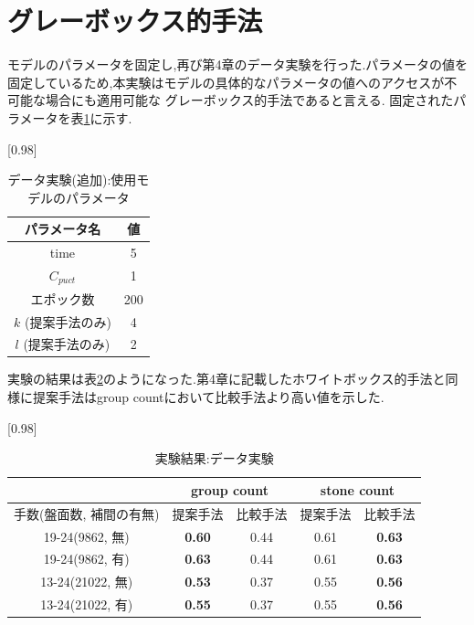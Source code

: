 \section{グレーボックス的手法}
\label{sec:gray}
モデルのパラメータを固定し,再び第4章のデータ実験を行った.パラメータの値を固定しているため,本実験はモデルの具体的なパラメータの値へのアクセスが不可能な場合にも適用可能な
グレーボックス的手法であると言える.
固定されたパラメータを表\ref{table:param-data-extra}に示す.
\begin{table}[H]
	\caption{データ実験(追加):使用モデルのパラメータ}
	\centering
	\scalebox{0.98}[0.98]{
		\begin{tabular}{c|c}
			パラメータ名 & 値 \\ \hline
			time    & 5 \\ 
			$C_{puct}$    & 1 \\
			エポック数 & 200 \\
			$k$ (提案手法のみ)     & 4 \\
			$l$ (提案手法のみ)     & 2 \\
		\end{tabular}
	}
	\label{table:param-data-extra}
\end{table}

実験の結果は表\ref{table:result-offline}のようになった.第4章に記載したホワイトボックス的手法と同様に提案手法はgroup countにおいて比較手法より高い値を示した.
\begin{table}[H]
	\caption{実験結果:データ実験}
	\centering
	\scalebox{0.98}[0.98]{
		\begin{tabular}{c|c|c|c|c}
			\multicolumn{1}{c}{} & \multicolumn{2}{|c|}{group count} 
			& \multicolumn{2}{c|}{stone count}\\ \hline \hline
			手数(盤面数, 補間の有無)    & 提案手法 & 比較手法 & 提案手法 & 比較手法 \\ \hline
			19-24(9862, 無)    & \bf{0.60} & 0.44 & 0.61 & \bf{0.63} \\
			19-24(9862, 有)    & \bf{0.63} & 0.44 & 0.61 & \bf{0.63}  \\
			13-24(21022, 無)   & \bf{0.53} & 0.37 & 0.55 & \bf{0.56}  \\
			13-24(21022, 有)   & \bf{0.55} & 0.37 & 0.55 & \bf{0.56}  \\
		\end{tabular}
	}
	\label{table:result-offline}
\end{table}

